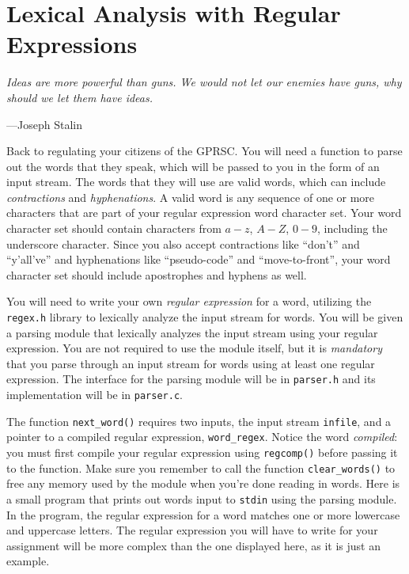 \documentclass{article}
\begin{document}
\section{Lexical Analysis with Regular Expressions}

\epigraph{\emph{Ideas are more powerful than guns. We would not let our
enemies have guns, why should we let them have ideas.}}{---Joseph
Stalin}

Back to regulating your citizens of the GPRSC. You will need a function
to parse out the words that they speak, which will be passed to you in
the form of an input stream. The words that they will use are valid
words, which can include \emph{contractions} and \emph{hyphenations}.
A valid word is any sequence of one or more characters that are part of
your regular expression word character set. Your word character set
should contain characters from $a-z$, $A-Z$, $0-9$, including the
underscore character. Since you also accept contractions like ``don't''
and ``y'all've'' and hyphenations like ``pseudo-code'' and
``move-to-front'', your word character set should include apostrophes
and hyphens as well.

You will need to write your own \emph{regular expression} for a word,
utilizing the \texttt{regex.h} library to lexically analyze the input
stream for words. You will be given a parsing module that lexically
analyzes the input stream using your regular expression. You are not
required to use the module itself, but it is \emph{mandatory} that you
parse through an input stream for words using at least one regular
expression. The interface for the parsing module will be in
\texttt{parser.h} and its implementation will be in \texttt{parser.c}.

The function \texttt{next\_word()} requires two inputs, the input stream
\texttt{infile}, and a pointer to a compiled regular expression,
\texttt{word\_regex}. Notice the word \emph{compiled}: you must first compile
your regular expression using \texttt{regcomp()} before passing it to the
function. Make sure you remember to call the function \texttt{clear\_words()} to
free any memory used by the module when you're done reading in words.
Here is a small program that prints out words input to \texttt{stdin}
using the parsing module. In the program, the regular expression for a
word matches one or more lowercase and uppercase letters. The regular
expression you will have to write for your assignment will be more
complex than the one displayed here, as it is just an example.
\end{document}
